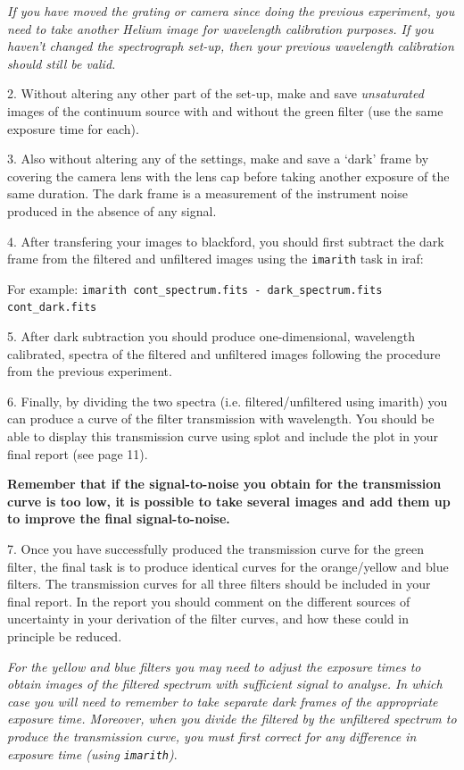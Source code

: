 \documentclass[12pt]{article}
\begin{document}
   {\it If you have moved the grating or camera since doing the previous
   experiment, you need to take another Helium image for
   wavelength calibration purposes. If you haven't changed the
   spectrograph set-up, then your previous wavelength calibration
   should still be valid.}

2. Without altering any other part of the set-up,  make and save {\sl
   unsaturated} images of the continuum source with and without the
   green filter (use the same exposure time for each).

3. Also without altering any of the settings, make and save a `dark' frame by
   covering the camera lens with the lens cap before taking another
   exposure of the same duration. The dark frame is a measurement of the
   instrument noise produced in the absence of any signal.

4. After transfering your images to blackford, you should first
   subtract the dark frame from the filtered and unfiltered images using
   the {\tt imarith} task in {\sc iraf}:

   For example: {\tt \verb,imarith cont_spectrum.fits - dark_spectrum.fits cont_dark.fits,}

5. After dark subtraction you should produce one-dimensional,
   wavelength calibrated, spectra of the filtered and unfiltered images
   following the procedure from the previous experiment.

\newpage

6. Finally, by dividing the two spectra (i.e. filtered/unfiltered
   using {\sc imarith}) you can produce a curve of
   the filter transmission with wavelength. You should be able to
   display this transmission curve using {\sc splot} and include the
   plot in your final report (see page 11).

   {\bf Remember that if the signal-to-noise you obtain for the transmission curve is too low, it is possible
to take several images and add them up to improve the final signal-to-noise.}

7. Once you have successfully produced the transmission curve for the
   green filter, the final task is to produce identical curves for the
   orange/yellow and blue filters. The transmission curves for all
   three filters should be included in your final report. In the
   report you should comment on the different sources of uncertainty in your
   derivation of the filter curves, and how these could in principle
   be reduced.

   {\it For the yellow and blue filters you may need to
   adjust the exposure times to obtain images of the
   filtered spectrum with sufficient signal to analyse. In which case 
   you will need to remember to take separate dark frames of the
   appropriate exposure time. Moreover, when you divide the filtered
   by the unfiltered spectrum to produce the transmission curve, you
   must first correct for any difference in exposure time (using {\tt imarith})}.
\end{document}
